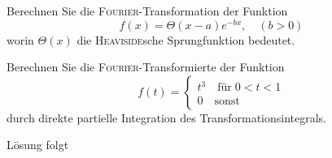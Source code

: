 \documentclass{atistandalonetask}
\begin{document}
  \begin{atiTask}[
    title = \textsc{Fourier}-Transformationen
  ]
	\begin{atiSubtasks}
	\item Berechnen Sie die \textsc{Fourier}-Transformation der Funktion
	\[
	f(x)=\Theta(x-a)e^{-bx},\quad (b>0)
	\]
	worin $\Theta(x)$ die \textsc{Heaviside}sche Sprungfunktion bedeutet.
	\item Berechnen Sie die \textsc{Fourier}-Transformierte der Funktion
	\[
	f(t)=\begin{cases}
	t^3\quad \text{für}\; 0<t<1\\
	0\quad \text{sonst}
		 \end{cases}
	\]
	durch direkte partielle Integration des Transformationsintegrals.
	\end{atiSubtasks}
  \end{atiTask}
  \begin{atiSolution}
   Lösung folgt
  \end{atiSolution}
\end{document}
